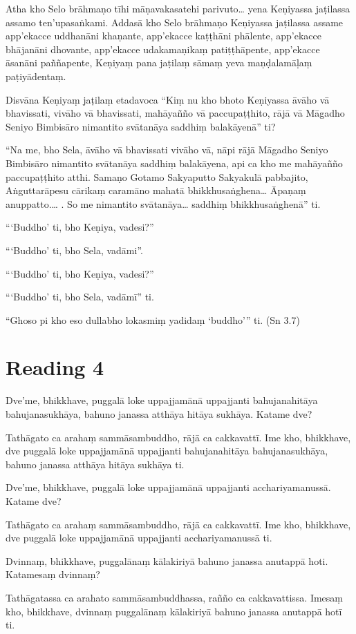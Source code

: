 Atha kho Selo brāhmaṇo tīhi māṇavakasatehi parivuto… yena Keṇiyassa jaṭilassa assamo ten’upasaṅkami. Addasā kho Selo brāhmaṇo Keṇiyassa jaṭilassa assame app’ekacce uddhanāni khaṇante, app’ekacce kaṭṭhāni phālente, app’ekacce bhājanāni dhovante, app’ekacce udakamaṇikaṃ patiṭṭhāpente, app’ekacce āsanāni paññapente, Keṇiyaṃ pana jaṭilaṃ sāmaṃ yeva maṇḍalamāḷaṃ paṭiyādentaṃ.

Disvāna Keṇiyaṃ jaṭilaṃ etadavoca “Kiṃ nu kho bhoto Keṇiyassa āvāho vā bhavissati, vivāho vā bhavissati, mahāyañño vā paccupaṭṭhito, rājā vā Māgadho Seniyo Bimbisāro nimantito svātanāya saddhiṃ balakāyenā” ti?

“Na me, bho Sela, āvāho vā bhavissati vivāho vā, nāpi rājā Māgadho Seniyo Bimbisāro nimantito svātanāya saddhiṃ balakāyena, api ca kho me mahāyañño paccupaṭṭhito atthi. Samaṇo Gotamo Sakyaputto Sakyakulā pabbajito, Aṅguttarāpesu cārikaṃ caramāno mahatā bhikkhusaṅghena… Āpaṇaṃ anuppatto.… . So me nimantito svātanāya… saddhiṃ bhikkhusaṅghenā” ti.

“‘Buddho’ ti, bho Keṇiya, vadesi?”

“‘Buddho’ ti, bho Sela, vadāmi”.

“‘Buddho’ ti, bho Keṇiya, vadesi?”

“‘Buddho’ ti, bho Sela, vadāmī” ti.

“Ghoso pi kho eso dullabho lokasmiṃ yadidaṃ ‘buddho’” ti. (Sn 3.7)

\section*{Reading 4}

Dve’me, bhikkhave, puggalā loke uppajjamānā uppajjanti bahujanahitāya bahujanasukhāya, bahuno janassa atthāya hitāya sukhāya. Katame dve?

Tathāgato ca arahaṃ sammāsambuddho, rājā ca cakkavattī. Ime kho, bhikkhave, dve puggalā loke uppajjamānā uppajjanti bahujanahitāya bahujanasukhāya, bahuno janassa atthāya hitāya sukhāya ti.

Dve’me, bhikkhave, puggalā loke uppajjamānā uppajjanti acchariyamanussā. Katame dve?

Tathāgato ca arahaṃ sammāsambuddho, rājā ca cakkavattī. Ime kho, bhikkhave, dve puggalā loke uppajjamānā uppajjanti acchariyamanussā ti.

Dvinnaṃ, bhikkhave, puggalānaṃ kālakiriyā bahuno janassa anutappā hoti. Katamesaṃ dvinnaṃ?

Tathāgatassa ca arahato sammāsambuddhassa, rañño ca cakkavattissa. Imesaṃ kho, bhikkhave, dvinnaṃ puggalānaṃ kālakiriyā bahuno janassa anutappā hotī ti.

